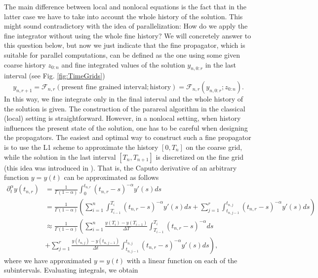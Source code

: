\documentclass[12pt,a4paper]{article}
\begin{document}
The main difference between local and nonlocal equations is the fact that in the latter case we have to take into account the whole history of the solution. This might sound contradictory with the idea of parallelization: How do we apply the fine integrator without using the whole fine history? We will concretely answer to this question below, but now we just indicate that the fine propagator, which is suitable for parallel computations, can be defined as the one using some given coarse history $z_{0:n}$ and fine integrated values of the solution $y_{n, 0:r}$ in the last interval (see Fig. \ref{fig:TimeGrids})
\begin{equation}\label{eqn:FinePropagatorGeneral}
	y_{n, r+1} = \mathcal{F}_{n,r} \left(\text{present fine grained interval}; \text{history} \right)= \mathcal{F}_{n,r} \left(y_{n, 0:r}; z_{0:n}\right).
\end{equation}
In this way, we fine integrate only in the final interval and the whole history of the solution is given. The construction of the parareal algorithm in the classical (local) setting is straightforward. However, in a nonlocal setting, when history influences the present state of the solution, one has to be careful when designing the propagators. The easiest and optimal way to construct such a fine propagator is to use the L1 scheme to approximate the history $[0,T_n]$ on the coarse grid, while the solution in the last interval \([T_n, T_{n+1}]\) is discretized on the fine grid (this idea was introduced in \cite{fu2019preconditioned}). That is, the Caputo derivative of an arbitrary function \(y=y(t)\) can be approximated as follows
\begin{equation}
	\begin{split}
		\partial^\alpha_t y(t_{n,r}) 
		&= \frac{1}{\Gamma(1-\alpha)} \int_0^{t_{n,r}} (t_{n,r} - s)^{-\alpha} y'(s) ds \\
		&= \frac{1}{\Gamma(1-\alpha)} \left(\sum_{i=1}^n \int_{T_{i-1}}^{T_i} (t_{n,r} - s)^{-\alpha} y'(s) ds + \sum_{j=1}^r \int_{t_{n, j-1}}^{t_{n, j}} (t_{n,r} - s)^{-\alpha} y'(s) ds \right) \\
		&\approx \frac{1}{\Gamma(1-\alpha)} \left(\sum_{i=1}^n \frac{y(T_i)-y(T_{i-1})}{\Delta T} \int_{T_{i-1}}^{T_i} (t_{n,r} - s)^{-\alpha} ds \right.\\
		&\left.+ \sum_{j=1}^r \frac{y(t_{n,j}) - y(t_{n,j-1})}{\Delta t} \int_{t_{n, j-1}}^{t_{n, j}} (t_{n,r} - s)^{-\alpha} y'(s) ds \right),
	\end{split}
\end{equation}
where we have approximated $y=y(t)$ with a linear function on each of the subintervals. Evaluating integrals, we obtain
\end{document}
